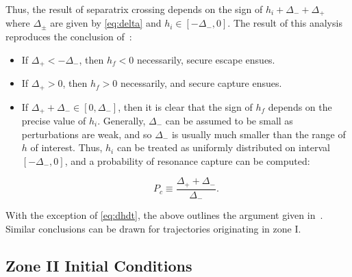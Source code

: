 \documentclass[
        fleqn,
        usenatbib,
    ]{mnras}
\begin{document}
Thus, the result of separatrix crossing depends on the sign of $h_i +
\Delta_- + \Delta_+$ where $\Delta_{\pm}$ are given by \autoref{eq:delta} and
$h_i \in [-\Delta_-, 0]$. The result of this analysis reproduces the conclusion
of~\cite{henrard1982}:
\begin{itemize}
    \item If $\Delta_+ < -\Delta_-$, then $h_f < 0$ necessarily, secure escape
        ensues.

    \item If $\Delta_+ > 0$, then $h_f > 0$ necessarily, and secure capture
        ensues.

    \item If $\Delta_+ + \Delta_- \in [0, \Delta_-]$, then it is clear that the
        sign of $h_f$ depends on the precise value of $h_i$. Generally,
        $\Delta_-$ can be assumed to be small as perturbations are weak, and
        so $\Delta_-$ is usually much smaller than the range of $h$ of interest.
        Thus, $h_i$ can be treated as uniformly distributed on interval
        $[-\Delta_-, 0]$, and a probability of resonance capture can be
        computed:

        \begin{equation}
            P_c \equiv \frac{\Delta_+ + \Delta_-}{\Delta_-}.
                \label{eq:p_c_gen}
        \end{equation}
\end{itemize}
With the exception of \autoref{eq:dhdt}, the above outlines the argument given
in~\cite{henrard1982}. Similar conclusions can be drawn for trajectories
originating in zone I.

\subsection{Zone II Initial Conditions}\label{ss:z2_ic}
\end{document}
